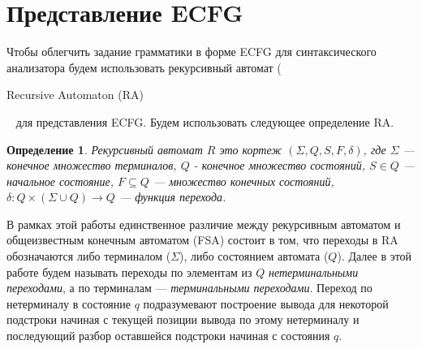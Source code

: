 \documentclass[14pt]{matmex-diploma-custom}
\newtheorem{mydef}{Определение}
\begin{document}
	\section{Представление ECFG}
	
	Чтобы облегчить задание грамматики в форме ECFG для синтаксического анализатора
	будем использовать рекурсивный автомат (\begin{english} Recursive Automaton (RA)\end{english}~\cite{tellier2006learning}
	для представления ECFG. Будем использовать следующее определение RA.
	\begin{mydef}
		Рекурсивный автомат $R$ это кортеж $(\Sigma, Q, S, F, \delta)$, где $\Sigma$
		--- конечное множество терминалов, $Q$ - конечное множество состояний, $S \in Q$ 
		--- начальное состояние, $F \subseteq Q$ --- множество конечных состояний,
		$\delta : Q \times (\Sigma \cup Q) \to Q$ --- функция перехода.
	\end{mydef}
	В рамках этой работы единственное различие между рекурсивным автоматом и общеизвестным
	конечным автоматом (FSA) состоит в том, что переходы в RA обозначаются либо терминалом ($\Sigma$),
	либо состоянием автомата ($Q$). Далее в этой работе будем называть переходы по элементам из
	$Q$ \textit{нетерминальными переходами}, а по терминалам --- \textit{терминальными переходами}.
    Переход по нетерминалу в состояние $q$ подразумевают построение вывода для некоторой подстроки начиная с текущей позиции
    вывода по этому нетерминалу и последующий разбор оставшейся подстроки начиная с состояния $q$.
     
\end{document}
